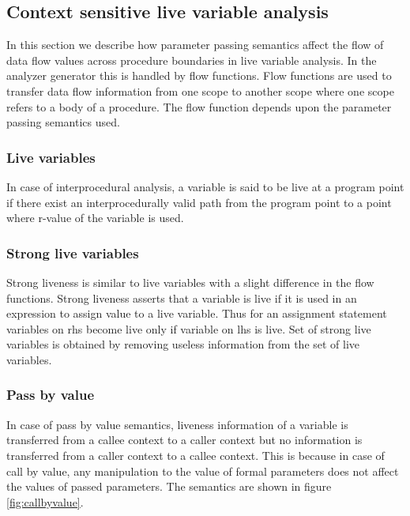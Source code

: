 \documentclass[12pt]{report}
\begin{document}
\subsection{Context sensitive live variable analysis}
In this section we describe how parameter passing semantics affect the flow of data flow values across procedure boundaries in live variable analysis. In the analyzer generator this is handled by flow functions. Flow functions are used to transfer data flow information from one scope to another scope where one scope refers to a body of a procedure. The flow function depends upon the parameter passing semantics used.

\subsubsection{Live variables}
In case of interprocedural analysis, a variable is said to be live at a program point if there exist an interprocedurally valid path from the program point to a point where r-value of the variable is used.

\subsubsection{Strong live variables}
Strong liveness is similar to live variables with a slight difference in the flow functions. Strong liveness asserts that a variable is live if it is used in an expression to assign value to a live variable. Thus for an assignment statement variables on rhs become live only if variable on lhs is live. Set of strong live variables is obtained by removing useless information from the set of live variables.


\subsubsection{Pass by value}
In case of pass by value semantics, liveness information of a variable is transferred from a callee context to a caller context but no information is transferred from a caller context to a callee context. This is because in case of call by value, any manipulation to the value of formal parameters does not affect the values of passed parameters. The semantics are shown in figure \ref{fig:callbyvalue}.
\end{document}
